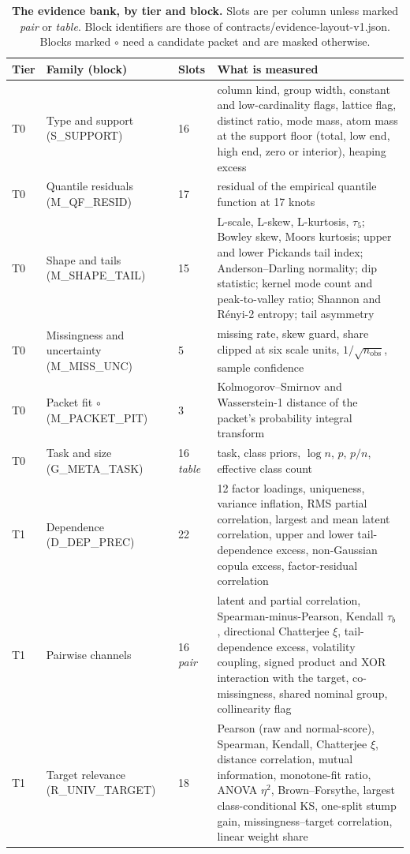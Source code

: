 \documentclass[10pt,letterpaper,twocolumn]{article}
\newcommand{\ct}[1]{{\bfseries\color{ink}#1}}   %
\newcommand{\cli}[1]{{\ttfamily\fontsize{8.9}{11}\selectfont #1}}
\newcommand{\tcli}[1]{{\ttfamily\fontsize{7.4}{9.4}\selectfont #1}}
\newcommand{\tablefont}{\fontsize{8.1}{10.2}\selectfont}
\newcommand{\thd}[1]{{\sffamily\bfseries\fontsize{7.2}{9}\selectfont\color{ink}#1}}  %
\begin{document}
\begin{table}[t]
\caption{\ct{The evidence bank, by tier and block.} Slots are per column unless marked \emph{pair} or \emph{table}. Block identifiers are those of \cli{contracts/evidence-layout-v1.json}. Blocks marked $\circ$ need a candidate packet and are masked otherwise.}\label{tab:evidence}
\tablefont
\begin{tabularx}{\textwidth}{@{}L{0.55cm}L{3.9cm}R{1.05cm}Y@{}}
\toprule
\thd{Tier} & \thd{Family (block)} & \thd{Slots} & \thd{What is measured}\\
\midrule
T0 & Type and support (\tcli{S\_SUPPORT}) & 16 & column kind, group width, constant and low-cardinality flags, lattice flag, distinct ratio, mode mass, atom mass at the support floor (total, low end, high end, zero or interior), heaping excess\\
T0 & Quantile residuals (\tcli{M\_QF\_RESID}) & 17 & residual of the empirical quantile function at 17 knots\\
T0 & Shape and tails (\tcli{M\_SHAPE\_TAIL}) & 15 & L-scale, L-skew, L-kurtosis, $\tau_5$; Bowley skew, Moors kurtosis; upper and lower Pickands tail index; Anderson--Darling normality; dip statistic; kernel mode count and peak-to-valley ratio; Shannon and R\'enyi-2 entropy; tail asymmetry\\
T0 & Missingness and uncertainty (\tcli{M\_MISS\_UNC}) & 5 & missing rate, skew guard, share clipped at six scale units, $1/\sqrt{n_{\mathrm{obs}}}$, sample confidence\\
T0 & Packet fit $\circ$ (\tcli{M\_PACKET\_PIT}) & 3 & Kolmogorov--Smirnov and Wasserstein-1 distance of the packet's probability integral transform\\
T0 & Task and size (\tcli{G\_META\_TASK}) & 16 \emph{table} & task, class priors, $\log n$, $p$, $p/n$, effective class count\\
\midrule
T1 & Dependence (\tcli{D\_DEP\_PREC}) & 22 & 12 factor loadings, uniqueness, variance inflation, RMS partial correlation, largest and mean latent correlation, upper and lower tail-dependence excess, non-Gaussian copula excess, factor-residual correlation\\
T1 & Pairwise channels & 16 \emph{pair} & latent and partial correlation, Spearman-minus-Pearson, Kendall $\tau_b$, directional Chatterjee $\xi$, tail-dependence excess, volatility coupling, signed product and XOR interaction with the target, co-missingness, shared nominal group, collinearity flag\\
T1 & Target relevance (\tcli{R\_UNIV\_TARGET}) & 18 & Pearson (raw and normal-score), Spearman, Kendall, Chatterjee $\xi$, distance correlation, mutual information, monotone-fit ratio, ANOVA $\eta^2$, Brown--Forsythe, largest class-conditional KS, one-split stump gain, missingness--target correlation, linear weight share\\

\end{tabularx}
\end{table}
\end{document}
